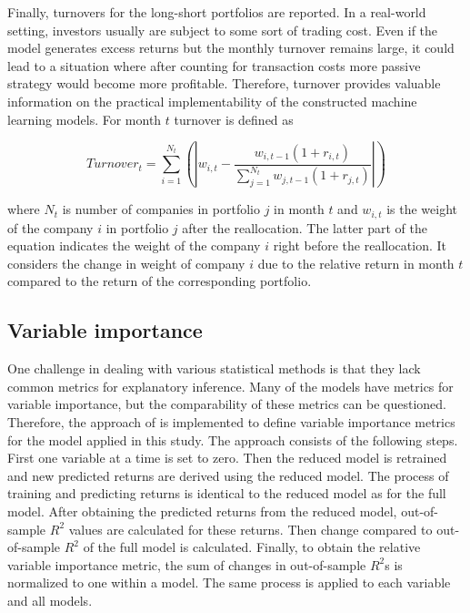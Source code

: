 \documentclass[12pt]{article}
\begin{document}
Finally, turnovers for the long-short portfolios are reported. In a real-world setting, investors usually are subject to some sort of trading cost. Even if the model generates excess returns but the monthly turnover remains large, it could lead to a situation where after counting for transaction costs more passive strategy would become more profitable. Therefore, turnover provides valuable information on the practical implementability of the constructed machine learning models. For month $t$ turnover is defined as \par

\begin{equation}
\label{eq:Turnover}
Turnover_t = \sum_{i=1}^{N_t}  \left ( \left | w_{i, t} - \frac{w_{i, t-1}(1 + r_{i, t})}{ \sum_{j=1}^{N_{t}} w_{j, t-1}(1 + r_{j, t})} \right | \right )
\end{equation}

where $N_t$ is number of companies in portfolio $j$ in month $t$ and $w_{i, t}$ is the weight of the company $i$ in portfolio $j$ after the reallocation. The latter part of the equation indicates the weight of the company $i$ right before the reallocation. It considers the change in weight of company $i$ due to the relative return in month $t$ compared to the return of the corresponding portfolio.

\subsection{Variable importance} \label{VariableImportance}

One challenge in dealing with various statistical methods is that they lack common metrics for explanatory inference. Many of the models have metrics for variable importance, but the comparability of these metrics can be questioned. Therefore, the approach of \citet{guetal} is implemented to define variable importance metrics for the model applied in this study. The approach consists of the following steps. First one variable at a time is set to zero. Then the reduced model is retrained and new predicted returns are derived using the reduced model. The process of training and predicting returns is identical to the reduced model as for the full model. After obtaining the predicted returns from the reduced model, out-of-sample $R^2$ values are calculated for these returns. Then change compared to out-of-sample $R^2$ of the full model is calculated. Finally, to obtain the relative variable importance metric, the sum of changes in out-of-sample $R^2$s is normalized to one within a model. The same process is applied to each variable and all models. \par
\end{document}
